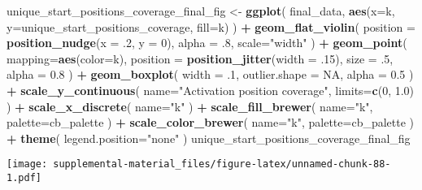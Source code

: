 \documentclass[]{book}
\newenvironment{Shaded}{\begin{snugshade}}{\end{snugshade}}
\newcommand{\DataTypeTok}[1]{\textcolor[rgb]{0.13,0.29,0.53}{#1}}
\newcommand{\DecValTok}[1]{\textcolor[rgb]{0.00,0.00,0.81}{#1}}
\newcommand{\FloatTok}[1]{\textcolor[rgb]{0.00,0.00,0.81}{#1}}
\newcommand{\KeywordTok}[1]{\textcolor[rgb]{0.13,0.29,0.53}{\textbf{#1}}}
\newcommand{\NormalTok}[1]{#1}
\newcommand{\OperatorTok}[1]{\textcolor[rgb]{0.81,0.36,0.00}{\textbf{#1}}}
\newcommand{\OtherTok}[1]{\textcolor[rgb]{0.56,0.35,0.01}{#1}}
\newcommand{\StringTok}[1]{\textcolor[rgb]{0.31,0.60,0.02}{#1}}
\begin{document}
\begin{Shaded}
\begin{Highlighting}[]
\NormalTok{unique_start_positions_coverage_final_fig <-}\StringTok{ }\KeywordTok{ggplot}\NormalTok{(}
\NormalTok{    final_data,}
    \KeywordTok{aes}\NormalTok{(}\DataTypeTok{x=}\NormalTok{k, }\DataTypeTok{y=}\NormalTok{unique_start_positions_coverage, }\DataTypeTok{fill=}\NormalTok{k)}
\NormalTok{  ) }\OperatorTok{+}
\StringTok{  }\KeywordTok{geom_flat_violin}\NormalTok{(}
    \DataTypeTok{position =} \KeywordTok{position_nudge}\NormalTok{(}\DataTypeTok{x =} \FloatTok{.2}\NormalTok{, }\DataTypeTok{y =} \DecValTok{0}\NormalTok{),}
    \DataTypeTok{alpha =} \FloatTok{.8}\NormalTok{,}
    \DataTypeTok{scale=}\StringTok{"width"}
\NormalTok{  ) }\OperatorTok{+}
\StringTok{  }\KeywordTok{geom_point}\NormalTok{(}
    \DataTypeTok{mapping=}\KeywordTok{aes}\NormalTok{(}\DataTypeTok{color=}\NormalTok{k),}
    \DataTypeTok{position =} \KeywordTok{position_jitter}\NormalTok{(}\DataTypeTok{width =} \FloatTok{.15}\NormalTok{),}
    \DataTypeTok{size =} \FloatTok{.5}\NormalTok{,}
    \DataTypeTok{alpha =} \FloatTok{0.8}
\NormalTok{  ) }\OperatorTok{+}
\StringTok{  }\KeywordTok{geom_boxplot}\NormalTok{(}
    \DataTypeTok{width =} \FloatTok{.1}\NormalTok{,}
    \DataTypeTok{outlier.shape =} \OtherTok{NA}\NormalTok{,}
    \DataTypeTok{alpha =} \FloatTok{0.5}
\NormalTok{  ) }\OperatorTok{+}
\StringTok{  }\KeywordTok{scale_y_continuous}\NormalTok{(}
    \DataTypeTok{name=}\StringTok{"Activation position coverage"}\NormalTok{,}
    \DataTypeTok{limits=}\KeywordTok{c}\NormalTok{(}\DecValTok{0}\NormalTok{, }\FloatTok{1.0}\NormalTok{)}
\NormalTok{  ) }\OperatorTok{+}
\StringTok{  }\KeywordTok{scale_x_discrete}\NormalTok{(}
    \DataTypeTok{name=}\StringTok{"k"}
\NormalTok{  ) }\OperatorTok{+}
\StringTok{  }\KeywordTok{scale_fill_brewer}\NormalTok{(}
    \DataTypeTok{name=}\StringTok{"k"}\NormalTok{,}
    \DataTypeTok{palette=}\NormalTok{cb_palette}
\NormalTok{  ) }\OperatorTok{+}
\StringTok{  }\KeywordTok{scale_color_brewer}\NormalTok{(}
    \DataTypeTok{name=}\StringTok{"k"}\NormalTok{,}
    \DataTypeTok{palette=}\NormalTok{cb_palette}
\NormalTok{  ) }\OperatorTok{+}
\StringTok{  }\KeywordTok{theme}\NormalTok{(}
    \DataTypeTok{legend.position=}\StringTok{"none"}
\NormalTok{  )}
\NormalTok{unique_start_positions_coverage_final_fig}
\end{Highlighting}
\end{Shaded}

\texttt{[image: supplemental-material\_files/figure-latex/unnamed-chunk-88-1.pdf]}
\end{document}
